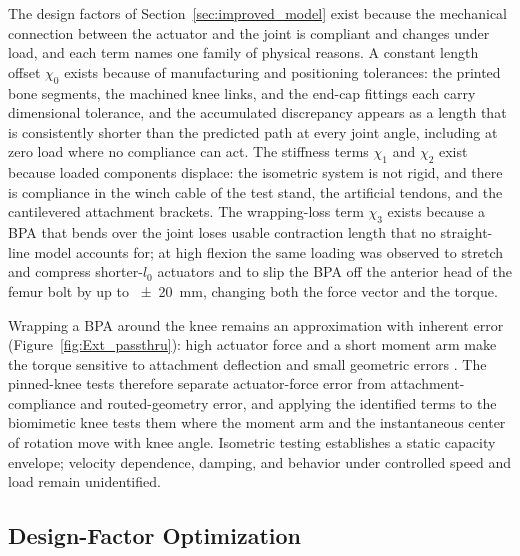 The design factors of Section~\ref{sec:improved_model} exist because the mechanical connection between the actuator and the joint is compliant and changes under load, and each term names one family of physical reasons. A constant length offset $\chi_{0}$ exists because of manufacturing and positioning tolerances: the printed bone segments, the machined knee links, and the end-cap fittings each carry dimensional tolerance, and the accumulated discrepancy appears as a length that is consistently shorter than the predicted path at every joint angle, including at zero load where no compliance can act. The stiffness terms $\chi_{1}$ and $\chi_{2}$ exist because loaded components displace: the isometric system is not rigid, and there is compliance in the winch cable of the test stand, the artificial tendons, and the cantilevered attachment brackets. The wrapping-loss term $\chi_{3}$ exists because a BPA that bends over the joint loses usable contraction length that no straight-line model accounts for; at high flexion the same loading was observed to stretch and compress shorter-$l_{0}$ actuators and to slip the BPA off the anterior head of the femur bolt by up to \qty{\pm 20}{\mm}, changing both the force vector and the torque.

Wrapping a BPA around the knee remains an approximation with inherent error (Figure~\ref{fig:Ext_passthru}): high actuator force and a short moment arm make the torque sensitive to attachment deflection and small geometric errors \citep{young_analyzing_2019}. The pinned-knee tests therefore separate actuator-force error from attachment-compliance and routed-geometry error, and applying the identified terms to the biomimetic knee tests them where the moment arm and the instantaneous center of rotation move with knee angle. Isometric testing establishes a static capacity envelope; velocity dependence, damping, and behavior under controlled speed and load remain unidentified.

\subsection{Design-Factor Optimization}\label{sec:ongoing}

